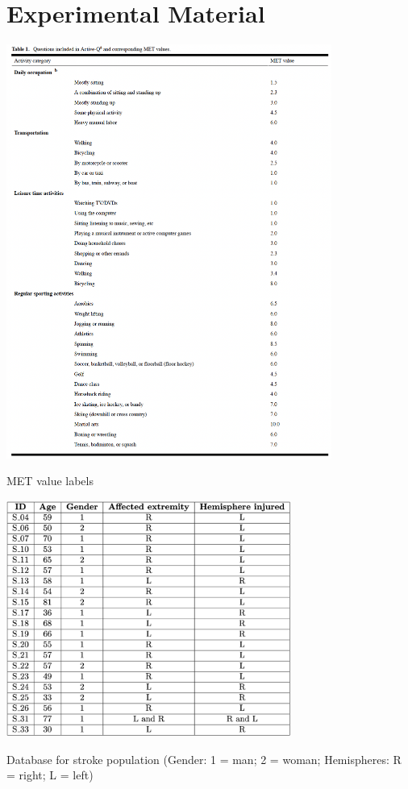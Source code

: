\appendix

\chapter{Experimental Material}
\begin{table}[ht]
    \centering
    \includegraphics[width=0.8\textwidth]{appendix/met_values.png}
    \caption{MET value labels \parencite{Bonn_2012}}
    \label{tab: met_values}
\end{table}
\begin{table}[ht]
    \centering
    \includegraphics[width=0.70\textwidth]{appendix/database_stroke.png}
    \caption{Database for stroke population (Gender: 1 = man; 2 = woman; Hemispheres: R = right; L = left) }
    \label{tab: Database stroke}
\end{table}

\clearpage


